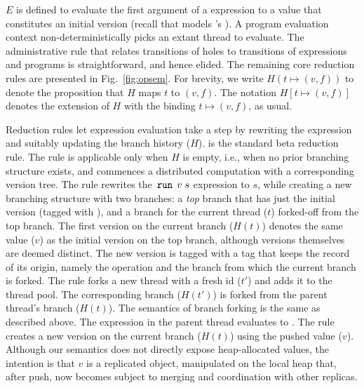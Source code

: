 $E$ is defined to evaluate the first argument of a  expression
to a value that constitutes an initial version (recall that 
models \name's ). A program evaluation
context non-deterministically picks an extant thread to evaluate. The
administrative rule that relates transitions of holes to transitions
of expressions and programs is straightforward, and hence elided. The
remaining core reduction rules are presented in
Fig.~\ref{fig:opsem}. For brevity, we write $H(t\mapsto (v,f))$ to
denote the proposition that $H$ maps $t$ to $(v,f)$. The notation $H[t
  \mapsto (v,f)]$ denotes the extension of $H$ with the binding $t
\mapsto (v,f)$, as usual.

Reduction rules let expression evaluation take a step by rewriting the
expression and suitably updating the branch history ($H$).
 is the standard beta reduction rule.  The
 rule is applicable only when $H$ is empty, i.e.,
when no prior branching structure exists, and commences a distributed
computation with a corresponding version tree. The rule rewrites the
$\,{\tt run}\,\;v\;s$ expression to $s$, while creating a new branching
structure with two branches: a \emph{top} branch that has just the
initial version (tagged with ), and a branch for the current
thread ($t$) forked-off from the top branch.  The first version on the
current branch ($H(t)$) denotes the same value ($v$) as the initial
version on the top branch, although versions themselves are deemed
distinct. The new version is tagged with a  tag that keeps the
record of its origin, namely the  operation and the branch from
which the current branch is forked. The  rule forks
a new thread with a fresh id ($t'$) and adds it to the thread pool.
The corresponding branch ($H(t')$) is forked from the parent thread's
branch ($H(t)$). The semantics of branch forking is the same as
described above. The  expression in the parent thread
evaluates to \C{()}. The  rule creates a new version
on the current branch ($H(t)$) using the pushed value ($v$).  Although
our semantics does not directly expose heap-allocated values, the
intention is that $v$ is a replicated object, manipulated on the local
heap that, after push, now becomes subject to merging and coordination
with other replicas.

